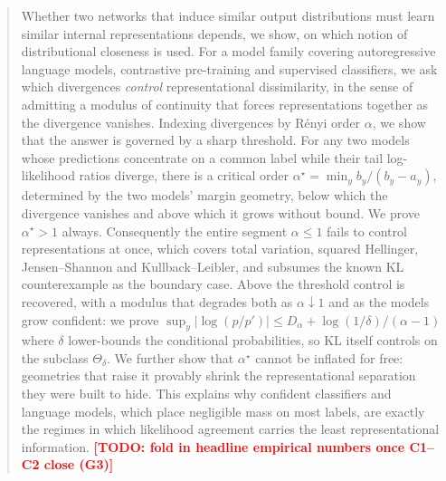 \documentclass{article}
\newcommand{\TODO}[1]{\textcolor{red}{\textbf{[TODO: #1]}}}
\theoremstyle{plain}
\theoremstyle{definition}
\theoremstyle{remark}
\begin{document}

\printAffiliationsAndNotice{}

\begin{abstract}
%
%
Whether two networks that induce similar output distributions must learn
similar internal representations depends, we show, on which notion of
distributional closeness is used. For a model family covering autoregressive
language models, contrastive pre-training and supervised classifiers, we ask
which divergences \emph{control} representational dissimilarity, in the sense
of admitting a modulus of continuity that forces representations together as
the divergence vanishes. Indexing divergences by R\'enyi order $\alpha$, we
show that the answer is governed by a sharp threshold. For any two models whose
predictions concentrate on a common label while their tail log-likelihood
ratios diverge, there is a critical order
$\alpha^{\star}=\min_{y}b_{y}/(b_{y}-a_{y})$, determined by the two models'
margin geometry, below which the divergence vanishes and above which it grows
without bound. We prove $\alpha^{\star}>1$ always. Consequently the entire
segment $\alpha\le1$ fails to control representations at once, which covers
total variation, squared Hellinger, Jensen--Shannon and Kullback--Leibler, and
subsumes the known KL counterexample as the boundary case. Above the threshold
control is recovered, with a modulus that degrades both as $\alpha\downarrow1$
and as the models grow confident: we prove
$\sup_{y}|\log(p/p')|\le D_{\alpha}+\log(1/\delta)/(\alpha-1)$ where
$\delta$ lower-bounds the conditional probabilities, so KL itself controls on
the subclass $\Theta_{\delta}$. We further show that $\alpha^{\star}$ cannot be
inflated for free: geometries that raise it provably shrink the
representational separation they were built to hide. This explains why
confident classifiers and language models, which place negligible mass on most
labels, are exactly the regimes in which likelihood agreement carries the least
representational information.
\TODO{fold in headline empirical numbers once C1--C2 close (G3)}
\end{abstract}
\end{document}
